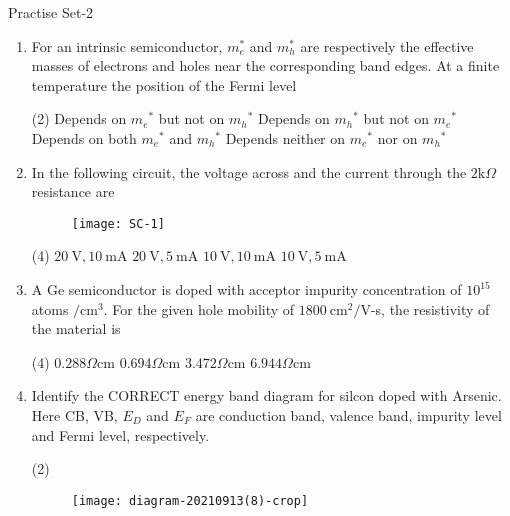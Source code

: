 \newpage
\begin{abox}
	Practise Set-2
\end{abox}
\begin{enumerate}
	\item For an intrinsic semiconductor, $m_{e}^{*}$ and $m_{h}^{*}$ are respectively the effective masses of electrons and holes near the corresponding band edges. At a finite temperature the position of the Fermi level
{	}
\begin{tasks}(2)
\task[\textbf{A.}] Depends on $m_{e}{ }^{*}$ but not on $m_{h}{ }^{*}$
\task[\textbf{B.}] Depends on $m_{h}{ }^{*}$ but not on $m_{e}{ }^{*}$
\task[\textbf{C.}] Depends on both $m_{e}{ }^{*}$ and $m_{h}{ }^{*}$
\task[\textbf{D.}] Depends neither on $m_{e}{ }^{*}$ nor on $m_{h}{ }^{*}$
\end{tasks}
	\item In the following circuit, the voltage across and the current through the $2 \mathrm{k} \Omega$ resistance are
{	}
\begin{figure}[H]
\centering
\texttt{[image: SC-1]}
\end{figure}
\begin{tasks}(4)
\task[\textbf{A.}] $20 \mathrm{~V}, 10 \mathrm{~mA}$
\task[\textbf{B.}] $20 \mathrm{~V}, 5 \mathrm{~mA}$
\task[\textbf{C.}] $10 \mathrm{~V}, 10 \mathrm{~mA}$
\task[\textbf{D.}] $10 \mathrm{~V}, 5 \mathrm{~mA}$
\end{tasks}
	\item A Ge semiconductor is doped with acceptor impurity concentration of $10^{15}$ atoms $/ \mathrm{cm}^{3}$. For the given hole mobility of $1800 \mathrm{~cm}^{2} / \mathrm{V}$-s, the resistivity of the material is
{	}
\begin{tasks}(4)
\task[\textbf{A.}] $0.288 \Omega \mathrm{cm}$
\task[\textbf{B.}] $0.694 \Omega \mathrm{cm}$
\task[\textbf{C.}] $3.472 \Omega \mathrm{cm}$
\task[\textbf{D.}] $6.944 \Omega \mathrm{cm}$
\end{tasks}
	\item Identify the CORRECT energy band diagram for silcon doped with Arsenic. Here CB, VB, $E_{D}$ and $E_{F}$ are conduction band, valence band, impurity level and Fermi level, respectively.
{	}
\begin{tasks}(2)
\task[\textbf{A.}] \begin{figure}[H]
	\centering
	\texttt{[image: diagram-20210913(8)-crop]}
\end{figure}

\end{tasks}
\end{enumerate}
